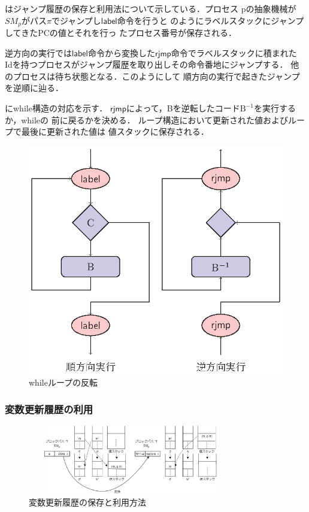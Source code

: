 \documentclass[submit,PRO]{ipsj}
\newcommand{\bcode}[1]{$\mathsf{#1}$}
\begin{document}
はジャンプ履歴の保存と利用法について示している．プロセス
pの抽象機械が$SM_p$がパス$\pi$でジャンプし\bcode{label}命令を行うと
のようにラベルスタックにジャンプしてきたPCの値とそれを行っ
たプロセス番号が保存される．

逆方向の実行では\bcode{label}命令から変換した\bcode{rjmp}命令でラベルスタックに積まれた
Idを持つプロセスがジャンプ履歴を取り出しその命令番地にジャンプする．
他のプロセスは待ち状態となる．このようにして
順方向の実行で起きたジャンプを逆順に辿る．

にwhile構造の対応を示す．
\bcode{rjmp}によって，Bを逆転したコード$\mathrm{B}^{-1}$を実行するか，whileの
前に戻るかを決める．
ループ構造において更新された値およびループで最後に更新された値は
値スタックに保存される．

\begin{figure}[tb]
\begin{center}
\includegraphics[width=.75\linewidth]{./while-flow.eps}
\end{center}
\caption{whileループの反転}
\label{fig:whileFlow}
\end{figure}

\subsubsection{変数更新履歴の利用}

\begin{figure}[tb]
\includegraphics[height=3.0cm,width=9.0cm]{./store.eps}
\caption{変数更新履歴の保存と利用方法}
\label{fig:store}
\end{figure}
\end{document}
